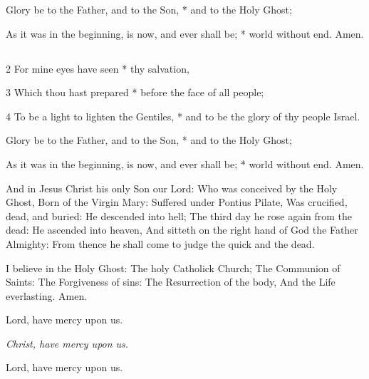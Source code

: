 Glory be to the Father, and to the Son, * and to the Holy Ghost;

As it was in the beginning, is now, and ever shall be; * world without end. Amen.

\medskip

\subsection{}


2 For mine eyes have seen * thy salvation,

3 Which thou hast prepared * before the face of all people;

4 To be a light to lighten the Gentiles, * and to be the glory of thy people Israel.

Glory be to the Father, and to the Son, * and to the Holy Ghost;

As it was in the beginning, is now, and ever shall be; * world without end. Amen.

\medskip


And in Jesus Christ his only Son our Lord: Who was conceived by the Holy Ghost, Born of the Virgin Mary: Suffered under Pontius Pilate, Was crucified, dead, and buried: He descended into hell; The third day he rose again from the dead: He ascended into heaven, And sitteth on the right hand of God the Father Almighty: From thence he shall come to judge the quick and the dead.

I believe in the Holy Ghost: The holy Catholick Church; The Communion of Saints: The Forgiveness of sins: The Resurrection of the body, And the Life everlasting. Amen.

\medskip


\centerline{Lord, have mercy upon us.}
\centerline{\emph{Christ, have mercy upon us.}}
\centerline{Lord, have mercy upon us.}

